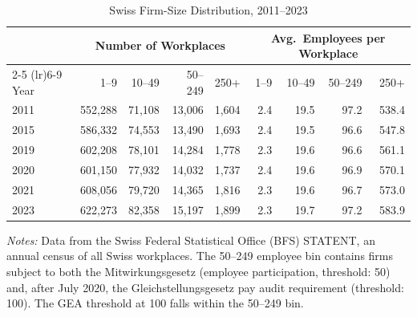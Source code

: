 \begin{table}[t]
\centering
\caption{Swiss Firm-Size Distribution, 2011--2023}
\label{tab:descriptive}
\begin{threeparttable}
\footnotesize
\begin{tabular}{l rrrr rrrr}
\toprule
 & \multicolumn{4}{c}{Number of Workplaces} & \multicolumn{4}{c}{Avg.\ Employees per Workplace} \\
\cmidrule(lr){2-5} \cmidrule(lr){6-9}
Year & 1--9 & 10--49 & 50--249 & 250+ & 1--9 & 10--49 & 50--249 & 250+ \\
\midrule
2011 & 552,288 & 71,108 & 13,006 & 1,604 & 2.4 & 19.5 & 97.2 & 538.4 \\
2015 & 586,332 & 74,553 & 13,490 & 1,693 & 2.4 & 19.5 & 96.6 & 547.8 \\
2019 & 602,208 & 78,101 & 14,284 & 1,778 & 2.3 & 19.6 & 96.6 & 561.1 \\
2020 & 601,150 & 77,932 & 14,032 & 1,737 & 2.4 & 19.6 & 96.9 & 570.1 \\
2021 & 608,056 & 79,720 & 14,365 & 1,816 & 2.3 & 19.6 & 96.7 & 573.0 \\
2023 & 622,273 & 82,358 & 15,197 & 1,899 & 2.3 & 19.7 & 97.2 & 583.9 \\
\bottomrule
\end{tabular}
\begin{tablenotes}[flushleft]\footnotesize
\item \textit{Notes:} Data from the Swiss Federal Statistical Office (BFS) STATENT, an annual census of all Swiss workplaces.
The 50--249 employee bin contains firms subject to both the Mitwirkungsgesetz (employee participation, threshold: 50) and,
after July 2020, the Gleichstellungsgesetz pay audit requirement (threshold: 100).
The GEA threshold at 100 falls within the 50--249 bin.
\end{tablenotes}
\end{threeparttable}
\end{table}
